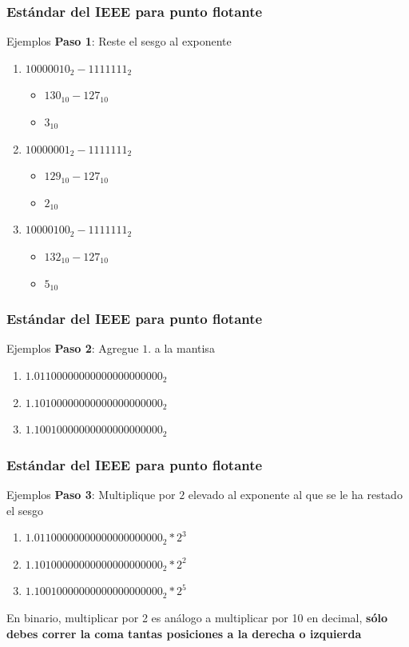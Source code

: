 \documentclass{beamer}
\begin{document}
\begin{frame}
	\frametitle{Estándar del IEEE para punto flotante}
	\begin{block}{Ejemplos}
	\textbf{Paso 1}: Reste el sesgo al exponente
	\begin{enumerate}
		\item $10000010_{2} - 1111111_{2}$
		\begin{itemize}
			\item $130_{10} - 127_{10}$
			\item $3_{10}$
		\end{itemize}
		\item $10000001_{2} - 1111111_{2}$
		\begin{itemize}
			\item $129_{10} - 127_{10}$
			\item $2_{10}$
		\end{itemize}
		\item $10000100_{2} - 1111111_{2}$
		\begin{itemize}
			\item $132_{10} - 127_{10}$
			\item $5_{10}$
		\end{itemize}
	\end{enumerate}	
	\end{block}
\end{frame}

\begin{frame}
	\frametitle{Estándar del IEEE para punto flotante}
	\begin{block}{Ejemplos}
	\textbf{Paso 2}: Agregue $1.$ a la mantisa
	\begin{enumerate}
		\item $1.01100000000000000000000_{2}$
		\item $1.10100000000000000000000_{2}$
		\item $1.10010000000000000000000_{2}$
	\end{enumerate}	
	\end{block}
\end{frame}

\begin{frame}
	\frametitle{Estándar del IEEE para punto flotante}
	\begin{block}{Ejemplos}
	\textbf{Paso 3}: Multiplique por $2$ elevado al exponente al que se le ha restado el sesgo
	\begin{enumerate}
		\item $1.01100000000000000000000_{2}*2^{3}$
		\item $1.10100000000000000000000_{2}*2^{2}$
		\item $1.10010000000000000000000_{2}*2^{5}$
	\end{enumerate}
		En binario, multiplicar por 2 es análogo a multiplicar por 10 en decimal, \textbf{sólo debes correr la coma tantas posiciones a la derecha o izquierda}
		
	\end{block}
\end{frame}
\end{document}
